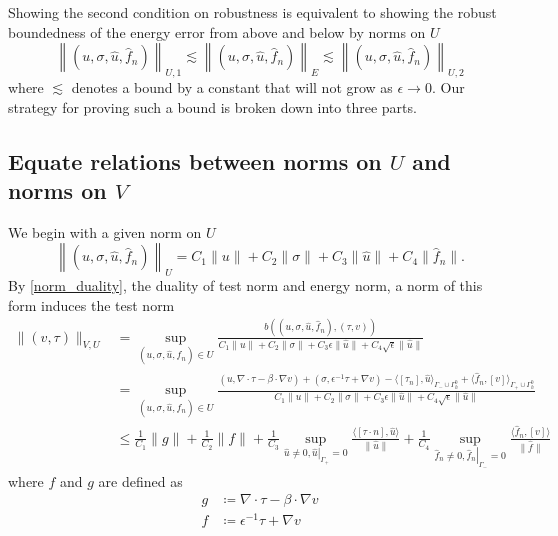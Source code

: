 \documentclass[11pt,onecolumn]{scrartcl}
\newcommand{\grad}{\nabla}
\renewcommand{\div}{\grad \cdot}
\begin{document}
Showing the second condition on robustness is equivalent to showing the robust boundedness of the energy error from above and below by norms on $U$ 
\[
\left\| \left(u,\sigma,\widehat{u},\widehat{f}_n\right)\right \|_{U,1} \lesssim  \left\| \left(u,\sigma,\widehat{u},\widehat{f}_n\right)\right \|_E \lesssim \left\| \left(u,\sigma,\widehat{u},\widehat{f}_n\right)\right \|_{U,2}
\]
where $\lesssim$ denotes a bound by a constant that will not grow as $\epsilon \rightarrow 0$.  
Our strategy for proving such a bound is broken down into three parts.  

\subsection{Equate relations between norms on $U$ and norms on $V$}
\label{sec:strategy1}
We begin with a given norm on $U$
\[
\left\|\left(u,\sigma,\widehat{u},\widehat{f}_n\right)\right\|_U = C_1 \|u\| + C_2 \|\sigma\| + C_3 \|\widehat{u}\| + C_4 \|\widehat{f}_n\|.
\]
By \eqref{norm_duality}, the duality of test norm and energy norm, a norm of this form induces the test norm
\begin{align*}
\|\left(v,\tau\right)\|_{V,U} &= \sup_{\left(u,\sigma,\widehat{u},\widehat{f}_n\right)\in U}\frac{b\left(\left(u,\sigma,\widehat{u},\widehat{f}_n\right),\left(\tau,v\right)\right)}{C_1\|u\| + C_2\|\sigma\| + C_3\epsilon\|\widehat{u}\|+ C_4\sqrt{\epsilon}\|\widehat{u}\|}\\
&= \sup_{\left(u,\sigma,\widehat{u},\widehat{f}_n\right)\in U}\frac{\left(u,\div \tau - \beta \cdot \grad v\right) + \left(\sigma, \epsilon^{-1} \tau + \grad v\right) - \langle \left[\tau_n\right], \widehat{u} \rangle_{\Gamma_-\cup \Gamma_h^0} + \langle \widehat{f}_n, \left[v\right] \rangle_{\Gamma_+ \cup \Gamma_h^0}}{C_1\|u\| + C_2\|\sigma\| + C_3\epsilon\|\widehat{u}\|+ C_4\sqrt{\epsilon}\|\widehat{u}\|}\\
& \leq \frac{1}{C_1}\|g\| + \frac{1}{C_2}\|f\| + \frac{1}{C_3}\sup_{\widehat{u}\neq 0, \left.\widehat{u}\right|_{\Gamma_+} = 0} \frac{\langle [\tau\cdot n], \widehat{u}\rangle}{\|\widehat{u}\|} +\frac{1}{C_4}\sup_{\widehat{f}_n\neq 0, \left.\widehat{f}_n\right|_{\Gamma_-}=0}\frac{\langle \widehat{f}_n, [v]\rangle}{\|\widehat{f}\|}
\end{align*}
where $f$ and $g$ are defined as 
\begin{align*}
g &\coloneqq \div \tau - \beta \cdot \grad v\\
f &\coloneqq \epsilon^{-1}\tau + \grad v
\end{align*}
\end{document}
